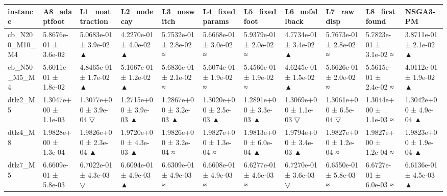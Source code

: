 \begin{tabular}{lllllllllll}
\toprule
instance & A8\_adaptfoot & L1\_noattraction & L2\_nodecay & L3\_noswitch & L4\_fixedparams & L5\_fixedfoot & L6\_nofallback & L7\_rawdisp & L8\_firstfound & NSGA3-PM \\
\midrule
cb\_N200\_M10\_M4 & 5.8676e-01 ± 3.6e-02 & 5.0683e-01 ± 3.9e-02 ▲ & 4.2270e-01 ± 4.0e-02 ▲ & 5.7532e-01 ± 2.8e-02 ≈ & 5.6668e-01 ± 3.0e-02 ≈ & 5.9379e-01 ± 2.0e-02 ≈ & 4.7734e-01 ± 3.4e-02 ▲ & 5.7673e-01 ± 2.8e-02 ≈ & 5.7823e-01 ± 3.1e-02 ≈ & 3.8711e-01 ± 2.1e-02 ▲ \\
cb\_N50\_M5\_M4 & 5.6011e-01 ± 1.8e-02 & 4.8465e-01 ± 1.7e-02 ▲ & 5.1667e-01 ± 1.2e-02 ▲ & 5.6836e-01 ± 2.1e-02 ≈ & 5.6074e-01 ± 1.9e-02 ≈ & 5.4566e-01 ± 1.9e-02 ≈ & 4.6245e-01 ± 1.5e-02 ▲ & 5.6626e-01 ± 2.0e-02 ≈ & 5.5615e-01 ± 2.4e-02 ≈ & 4.0112e-01 ± 1.9e-02 ▲ \\
dtlz2\_M5 & 1.3047e+00 ± 1.1e-03 & 1.3077e+00 ± 3.9e-04 ▽ & 1.2715e+00 ± 3.9e-03 ▲ & 1.2867e+00 ± 3.2e-03 ▲ & 1.3020e+00 ± 2.5e-03 ▲ & 1.2891e+00 ± 3.3e-03 ▲ & 1.3069e+00 ± 1.1e-03 ▽ & 1.3061e+00 ± 6.5e-04 ▽ & 1.3044e+00 ± 1.1e-03 ≈ & 1.3042e+00 ± 4.9e-04 ▲ \\
dtlz4\_M8 & 1.9828e+00 ± 1.3e-04 & 1.9826e+00 ± 2.3e-04 ▲ & 1.9720e+00 ± 4.3e-03 ▲ & 1.9826e+00 ± 3.2e-04 ≈ & 1.9827e+00 ± 1.3e-04 ≈ & 1.9813e+00 ± 6.0e-04 ▲ & 1.9794e+00 ± 3.4e-03 ▲ & 1.9827e+00 ± 1.2e-04 ≈ & 1.9827e+00 ± 1.2e-04 ≈ & 1.9823e+00 ± 1.9e-04 ▲ \\
dtlz7\_M5 & 6.6609e-01 ± 5.8e-03 & 6.7022e-01 ± 4.3e-03 ▽ & 6.6094e-01 ± 4.9e-03 ▲ & 6.6309e-01 ± 4.9e-03 ≈ & 6.6608e-01 ± 4.9e-03 ≈ & 6.6277e-01 ± 4.6e-03 ≈ & 6.7270e-01 ± 3.6e-03 ▽ & 6.6550e-01 ± 5.8e-03 ≈ & 6.6727e-01 ± 6.0e-03 ≈ & 6.6136e-01 ± 4.5e-03 ▲ \\
\bottomrule
\end{tabular}
